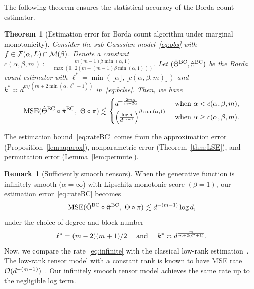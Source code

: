 \documentclass[12pt]{article}
\newtheorem{thm}{Theorem}
\theoremstyle{definition}
\newtheorem{rmk}{Remark}
\begin{document}
The following theorem ensures the statistical accuracy of the Borda count estimator.
\begin{thm}[Estimation error for Borda count algorithm under marginal monotonicity]\label{thm:BC} Consider the sub-Gaussian model~\eqref{eq:obs} with $f\in \mathcal{F}(\alpha,L)\cap \mathcal{M}(\beta)$.
Denote a constant $c(\alpha,\beta,m):= \frac{m(m-1)\beta\min(\alpha,1)}{\max(0,\ 2(m-(m-1)\beta\min(\alpha,1)))}$. Let $(\hat\Theta^{\textup{BC}},\hat\pi^{\textup{BC}})$ be the Borda count estimator with {\footnotesize $
\ell^* = \min\left(\lfloor\alpha\rfloor,\lfloor c(\alpha,\beta,m)\rfloor\right)$} and $k^* \asymp d^{m/ (m+2\min(\alpha,\ell^*+1))}$ in~\eqref{eq:bclse}. Then, we have
\begin{align}\label{eq:rateBC}
\textup{MSE}(\hat\Theta^{\textup{BC}}\circ\hat\pi^{\textup{BC}},\ \Theta\circ\pi)  \lesssim  
   \begin{cases}
   d^{-{2m\alpha\over m+2\alpha}} & \text{ when } \alpha <c(\alpha,\beta,m),\\
   \left({\log d\over d^{m-1}}\right)^{\beta\min(\alpha,1)}&\text{ when } \alpha \geq c(\alpha,\beta,m).
   \end{cases}
\end{align}
\end{thm}
The estimation bound~\eqref{eq:rateBC} comes from the approximation error (Proposition~\ref{lem:approx}), nonparametric error (Theorem~\ref{thm:LSE}), and permutation error (Lemma~\ref{lem:permute}). 

\begin{rmk}[Sufficiently smooth tensors]\label{rm2} When the generative function is infinitely smooth ($\alpha =\infty$) with Lipschitz monotonic score $(\beta=1)$,
our estimation error~\eqref{eq:rateBC} becomes
\begin{equation}\label{eq:infinite}
\textup{MSE}(\hat\Theta^{\textup{BC}}\circ\hat\pi^{\textup{BC}},\ \Theta\circ\pi)\lesssim d^{-(m-1)}\log d,
\end{equation}
under the choice of degree and block number
\begin{equation}\label{eq:choice}
\ell^*= {(m-2)(m+1)/2}\quad \text{ and } \quad k^* \asymp d^{m\over m +2(\ell^*+1)}.
\end{equation}
Now, we compare the rate~\eqref{eq:infinite} with the classical low-rank estimation~\citep{wang2018learning,zhang2018tensor,kolda2009tensor}. The low-rank tensor model with a constant rank is known to have MSE rate $\mathcal{O}(d^{-(m-1)})$~\citep{wang2018learning}. Our infinitely smooth tensor model achieves the same rate up to the negligible log term. 
\end{rmk}
\end{document}

